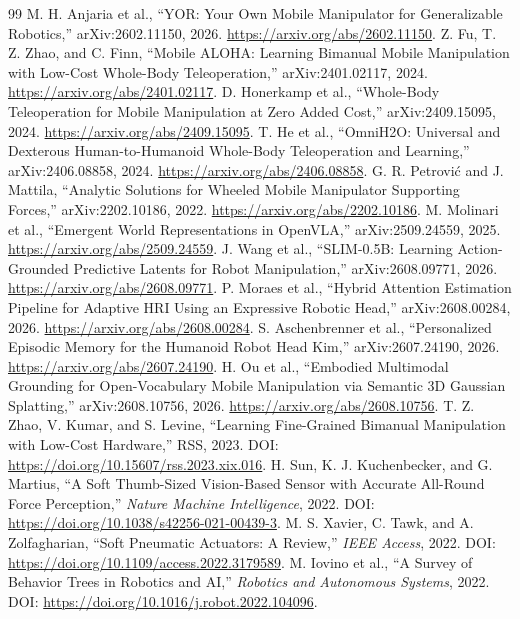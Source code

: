 \documentclass[10pt,a4paper]{article}
\begin{document}
\begin{thebibliography}{99}\small
{} M. H. Anjaria et al., ``YOR: Your Own Mobile Manipulator for Generalizable Robotics,'' arXiv:2602.11150, 2026. \url{https://arxiv.org/abs/2602.11150}.
 Z. Fu, T. Z. Zhao, and C. Finn, ``Mobile ALOHA: Learning Bimanual Mobile Manipulation with Low-Cost Whole-Body Teleoperation,'' arXiv:2401.02117, 2024. \url{https://arxiv.org/abs/2401.02117}.
 D. Honerkamp et al., ``Whole-Body Teleoperation for Mobile Manipulation at Zero Added Cost,'' arXiv:2409.15095, 2024. \url{https://arxiv.org/abs/2409.15095}.
 T. He et al., ``OmniH2O: Universal and Dexterous Human-to-Humanoid Whole-Body Teleoperation and Learning,'' arXiv:2406.08858, 2024. \url{https://arxiv.org/abs/2406.08858}.
 G. R. Petrovi\'c and J. Mattila, ``Analytic Solutions for Wheeled Mobile Manipulator Supporting Forces,'' arXiv:2202.10186, 2022. \url{https://arxiv.org/abs/2202.10186}.
 M. Molinari et al., ``Emergent World Representations in OpenVLA,'' arXiv:2509.24559, 2025. \url{https://arxiv.org/abs/2509.24559}.
 J. Wang et al., ``SLIM-0.5B: Learning Action-Grounded Predictive Latents for Robot Manipulation,'' arXiv:2608.09771, 2026. \url{https://arxiv.org/abs/2608.09771}.
 P. Moraes et al., ``Hybrid Attention Estimation Pipeline for Adaptive HRI Using an Expressive Robotic Head,'' arXiv:2608.00284, 2026. \url{https://arxiv.org/abs/2608.00284}.
 S. Aschenbrenner et al., ``Personalized Episodic Memory for the Humanoid Robot Head Kim,'' arXiv:2607.24190, 2026. \url{https://arxiv.org/abs/2607.24190}.
 H. Ou et al., ``Embodied Multimodal Grounding for Open-Vocabulary Mobile Manipulation via Semantic 3D Gaussian Splatting,'' arXiv:2608.10756, 2026. \url{https://arxiv.org/abs/2608.10756}.
 T. Z. Zhao, V. Kumar, and S. Levine, ``Learning Fine-Grained Bimanual Manipulation with Low-Cost Hardware,'' RSS, 2023. DOI: \url{https://doi.org/10.15607/rss.2023.xix.016}.
 H. Sun, K. J. Kuchenbecker, and G. Martius, ``A Soft Thumb-Sized Vision-Based Sensor with Accurate All-Round Force Perception,'' \emph{Nature Machine Intelligence}, 2022. DOI: \url{https://doi.org/10.1038/s42256-021-00439-3}.
 M. S. Xavier, C. Tawk, and A. Zolfagharian, ``Soft Pneumatic Actuators: A Review,'' \emph{IEEE Access}, 2022. DOI: \url{https://doi.org/10.1109/access.2022.3179589}.
 M. Iovino et al., ``A Survey of Behavior Trees in Robotics and AI,'' \emph{Robotics and Autonomous Systems}, 2022. DOI: \url{https://doi.org/10.1016/j.robot.2022.104096}.

\end{thebibliography}
\end{document}
